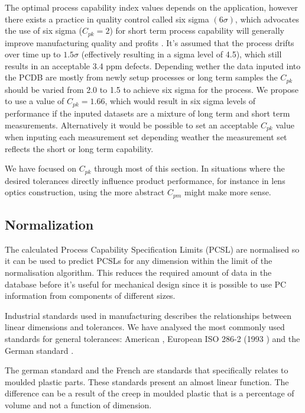 \documentclass[aip,amsmath, reprint, author-year]{revtex4-1}
\begin{document}
The optimal process capability index values depends on the application, however there exists a practice in quality control called six sigma $(6 \sigma)$, which advocates the use of six sigma ($C_{pk} = 2$) for short term process capability will generally improve manufacturing quality and profits \cite{koch2004design}. 
It's assumed that the process drifts over time up to $1.5 \sigma$ (effectively resulting in a sigma level of 4.5), which still results in an acceptable 3.4 ppm defects. 
Depending wether the data inputed into the PCDB are mostly from newly setup processes or long term samples the $C_{pk}$ should be varied from 2.0 to 1.5 to achieve six sigma for the process. 
We propose to use a value of $C_{pk} = 1.66$, which would result in six sigma levels of performance if the inputed datasets are a mixture of long term and short term measurements. 
Alternatively it would be possible to set an acceptable $C_{pk}$ value when inputing each measurement set depending weather the measurement set reflects the short or long term capability. 

We have focused on $C_{pk}$ through most of this section.
In situations where the desired tolerances directly influence product performance, for instance in lens optics construction, using the more abstract $C_{pm}$ might make more sense. 

\subsection{Normalization}

The calculated Process Capability Specification Limits (PCSL) are normalised so it can be used to predict PCSLs for any dimension within the limit of the normalisation algorithm. 
This reduces the required amount of data in the database before it's useful for mechanical design since it is possible to use PC information from components of different sizes.

Industrial standards used in manufacturing describes the relationships between linear dimensions and tolerances. We have analysed the most commonly used standards for general tolerances: American \citeauthor{american1978preferred}, European ISO 286-2 (1993 ) and the German standard \citeauthor{DIN7168}.

The german standard \citeauthor{DIN16901} and the French \citeauthor{NFT58000} are standards that specifically relates to moulded plastic parts. These standards present an almost linear function. The difference can be a result of the creep in moulded plastic that is a percentage of volume and not a function of dimension.
\end{document}
